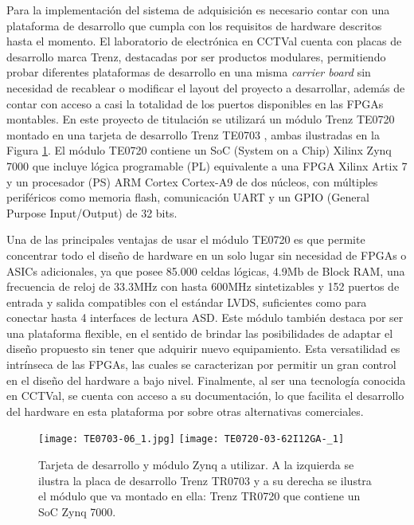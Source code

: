 		Para la implementación del sistema de adquisición es necesario contar con una plataforma de desarrollo que cumpla con los requisitos de hardware descritos hasta el momento. El laboratorio de electrónica en CCTVal cuenta con placas de desarrollo marca Trenz, destacadas por ser productos modulares, permitiendo probar diferentes plataformas de desarrollo en una misma \textit{carrier board} sin necesidad de recablear o modificar el layout del proyecto a desarrollar, además de contar con acceso a casi la totalidad de los puertos disponibles en las FPGAs montables. En este proyecto de titulación se utilizará un módulo Trenz TE0720 \cite{TrenzElectronic2020TE0720Wiki} montado en una tarjeta de desarrollo Trenz TE0703 \cite{TrenzElectronic2019TE0703Wiki}, ambas ilustradas en la Figura \ref{fig:trenz}. El módulo TE0720 contiene un SoC (System on a Chip) Xilinx Zynq 7000 \cite{Xilinx2012Zynq-7000Architecture} que incluye lógica programable (PL) equivalente a una FPGA Xilinx Artix 7\cite{Xilinx20107DS180} y un procesador (PS) ARM Cortex Cortex-A9 de dos núcleos, con múltiples periféricos como memoria flash, comunicación UART y un GPIO (General Purpose Input/Output) de 32 bits.
		
		Una de las principales ventajas de usar el módulo TE0720 es que permite concentrar todo el diseño de hardware en un solo lugar sin necesidad de FPGAs o ASICs adicionales, ya que posee 85.000 celdas lógicas, 4.9Mb de Block RAM, una frecuencia de reloj de 33.3MHz con hasta 600MHz sintetizables y 152 puertos de entrada y salida compatibles con el estándar LVDS, suficientes como para conectar hasta 4 interfaces de lectura ASD. Este módulo también destaca por ser una plataforma flexible, en el sentido de brindar las posibilidades de adaptar el diseño propuesto sin tener que adquirir nuevo equipamiento. Esta versatilidad es intrínseca de las FPGAs, las cuales se caracterizan por permitir un gran control en el diseño del hardware a bajo nivel. Finalmente, al ser una tecnología conocida en CCTVal, se cuenta con acceso a su documentación, lo que facilita el desarrollo del hardware en esta plataforma por sobre otras alternativas comerciales.
		
		\begin{figure}[H]
			\centering
			\texttt{[image: TE0703-06\_1.jpg]}
			\texttt{[image: TE0720-03-62I12GA-\_1]}
			\caption{Tarjeta de desarrollo y módulo Zynq a utilizar. A la izquierda se ilustra la placa de desarrollo Trenz TR0703\cite{TrenzElectronic2019TE0703Wiki} y a su derecha se ilustra el módulo que va montado en ella: Trenz TR0720\cite{TrenzElectronic2020TE0720Wiki} que contiene un SoC Zynq 7000\cite{Xilinx2012Zynq-7000Architecture}.}
			\label{fig:trenz}
		\end{figure}
	
